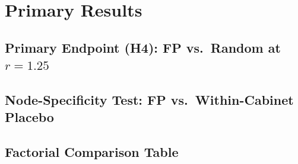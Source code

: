 
\section{Primary Results}
\label{sec:results}

\subsection{Primary Endpoint (H4): FP vs.\ Random at $r=1.25$}

\subsection{Node-Specificity Test: FP vs.\ Within-Cabinet Placebo}

\subsection{Factorial Comparison Table}

